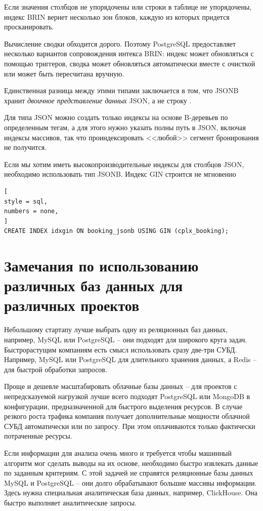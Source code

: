 \documentclass[%
	11pt,
	a4paper,
	utf8,
		]{article}
\begin{document}
Если значения столбцов не упорядочены или строки в таблице не упорядочены, индекс BRIN вернет несколько зон блоков, каждую из которых придется просканировать.

Вычисление сводки обходится дорого. Поэтому PostgreSQL предоставляет несколько вариантов сопровождения интекса BRIN: индекс может обновляться с помощью триггеров, сводка может обновляться автоматически вместе с очисткой или может быть пересчитана вручную. 

Единственная разница между этими типами заключается в том, что JSONB хранит \emph{двоичное представление данных} JSON, а не строку \cite[]{dombrovskaya:postgresql-2022}.

Для типа JSON можно создать только индексы на основе B-деревьев по определенным тегам, а для этого нужно указать полны путь в JSON, включая индексы массивов, так что проиндексировать <<любой>> сегмент бронирования не получится.

Если мы хотим иметь высокопроизводительные индексы для столбцов JSON, необходимо использовать тип JSONB. Индекс GIN строится не мгновенно
\begin{lstlisting}[
style = sql,
numbers = none,
]
CREATE INDEX idxgin ON booking_jsonb USING GIN (cplx_booking);
\end{lstlisting}






\section{Замечания по использованию различных баз данных для различных проектов}

Небольшому стартапу лучше выбрать одну из реляционных баз данных, например, MySQL или PostgreSQL -- они подходят для широкого круга задач. Быстрорастущим компаниям есть смысл использовать сразу две-три СУБД. Например, MySQL или PostgreSQL для длительного хранения данных, а Redis -- для быстрой обработки запросов.

Проще и дешевле масштабировать облачные базы данных -- для проектов с непредсказуемой нагрузкой лучше всего подходят PostgreSQL или MongoDB в конфигурации, предназначенной для быстрого выделения ресурсов. В случае резкого роста трафика компания получает дополнительные мощности облачной СУБД автоматически или по запросу. При этом оплачиваются только фактически потраченные ресурсы.

Если информации для анализа очень много и требуется чтобы машинный алгоритм мог сделать выводы на их основе, необходимо быстро извлекать данные по заданным критериям. С этой задачей не справятся реляционные базы данных MySQL и PostgreSQL -- они долго обрабатывают большие массивы информации. Здесь нужна специальная аналитическая база данных, например, ClickHouse. Она быстро выполняет аналитические запросы.
\end{document}
